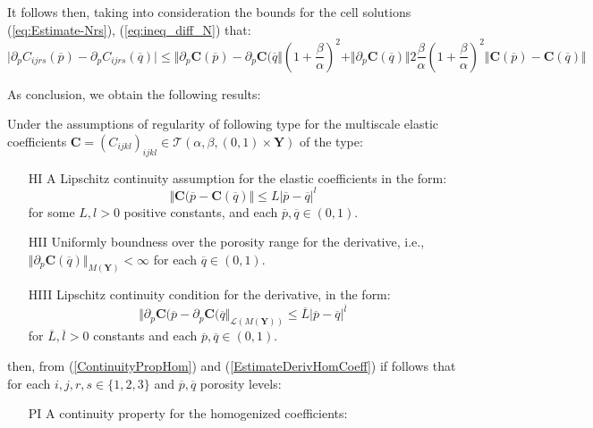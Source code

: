 It follows then, taking into consideration the bounds for the cell solutions (\ref{eq:Estimate-Nrs}), (\ref{eq:ineq_diff_N}) that:
\begin{equation}
    \label{EstimateDiffDeriv}
    \vert \partial_p C_{ijrs}(\overline{p}) - \partial_p C_{ijrs}(\overline{q}) \vert \leq \Vert \partial_p \mathbf{C}(\overline{p}) - \partial_p \mathbf{C}(\overline{q} \Vert  (1+ \frac{\beta}{\alpha})^2 + \Vert \partial_p \mathbf{C}(\overline{q}) \Vert 2\frac{\beta}{\alpha}(1+\frac{\beta}{\alpha})^2 \Vert \mathbf{C}(\overline{p}) - \mathbf{C}(\overline{q}) \Vert
\end{equation}

As conclusion, we obtain the following results:
\begin{prop}
Under the assumptions of regularity of following type for the multiscale elastic coefficients $\mathbf{C} = (C_{ijkl})_{ijkl} \in \mathcal{T}(\alpha, \beta, (0,1)\times \mathbf{Y})$ of the type:
\begin{enumerate}
    \item[HI] A Lipschitz continuity assumption for the elastic coefficients in the form:
    \begin{equation*}
        \Vert \mathbf{C}(\overline{p} - \mathbf{C}(\overline{q}) \Vert \leq L \vert \overline{p} - \overline{q} \vert^{l} 
    \end{equation*}
    for some $L, l > 0$ positive constants, and each $\overline{p},\overline{q} \in (0,1)$.
    \item[HII] Uniformly boundness over the porosity range for the derivative, i.e., $\Vert \partial_p \mathbf{C}(\overline{q}) \Vert_{M(\mathbf{Y})} < \infty$ for each $\overline{q} \in (0,1)$.
    \item[HIII] Lipschitz continuity condition for the derivative, in the form:
    \begin{equation*}
        \Vert \partial_p \mathbf{C}(\overline{p}- \partial_p \mathbf{C}(\overline{q} \Vert_{\mathcal{L}(M(\mathbf{Y}))} \leq \overline{L} \vert \overline{p}-\overline{q}\vert^{\overline{l}}
    \end{equation*}
    for $\overline{L}, \overline{l} > 0$ constants and each $\overline{p},\overline{q} \in (0,1)$.
\end{enumerate}
then, from (\ref{ContinuityPropHom}) and (\ref{EstimateDerivHomCoeff}) if follows that for each $i,j,r,s \in \{1,2,3\}$ and $\overline{p},\overline{q}$ porosity levels:
\begin{enumerate}
    \item[PI] A continuity property for the homogenized coefficients:

\end{enumerate}
\end{prop}
